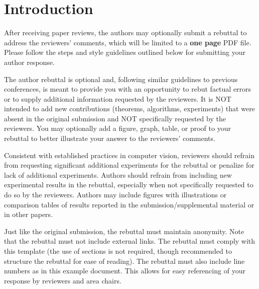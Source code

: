 \documentclass[10pt,twocolumn,letterpaper]{article}
\begin{document}

\thispagestyle{empty}
\appendix


\section{Introduction}

After receiving paper reviews, the authors may optionally submit a rebuttal to address the reviewers' comments, which will be limited to a {\bf one page} PDF file.
Please follow the steps and style guidelines outlined below for submitting your author response.

The author rebuttal is optional and, following similar guidelines to previous conferences, is meant to provide you with an opportunity to rebut factual errors or to supply additional information requested by the reviewers.
It is NOT intended to add new contributions (theorems, algorithms, experiments) that were absent in the original submission and NOT specifically requested by the reviewers.
You may optionally add a figure, graph, table, or proof to your rebuttal to better illustrate your answer to the reviewers' comments.

Consistent with established practices in computer vision, reviewers should refrain from requesting significant additional experiments for the rebuttal or penalize for lack of additional experiments.
Authors should refrain from including new experimental results in the rebuttal, especially when not specifically requested to do so by the reviewers.
Authors may include figures with illustrations or comparison tables of results reported in the submission/supplemental material or in other papers.

Just like the original submission, the rebuttal must maintain anonymity.
Note that the rebuttal must not include external links.
The rebuttal must comply with this template (the use of sections is not required, though recommended to structure the rebuttal for ease of reading).
The rebuttal must also include line numbers as in this example document.
This allows for easy referencing of your response by reviewers and area chairs.
\end{document}
